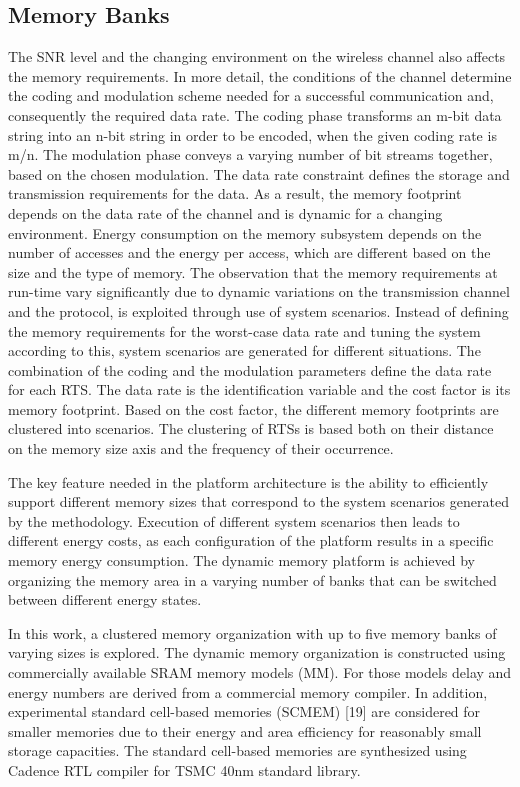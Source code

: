 \subsection{Memory Banks}

The SNR level and the changing environment on the wireless channel also affects the memory requirements. In more detail, the conditions of the channel determine the coding and modulation scheme needed for a successful communication and, consequently the required data rate. The coding phase transforms an m-bit data string into an n-bit string in order to be encoded, when the given coding rate is m/n. The modulation phase conveys a varying number of bit streams together, based on the chosen modulation. The data rate constraint defines the storage and transmission requirements for the data. As a result, the memory footprint depends on the data rate of the channel and is dynamic for a changing environment. Energy consumption on the memory subsystem depends on the number of accesses and the energy per access, which are different based on the size and the type of memory.
The observation that the memory requirements at run-time vary significantly due to dynamic variations on the transmission channel and the protocol, is exploited through use of system scenarios. Instead of defining the memory requirements for the worst-case data rate and tuning the system according to this, system scenarios are generated for different situations. The combination of the coding and the modulation parameters define the data rate for each RTS. The data rate is the identification variable and the cost factor is its memory footprint. Based on the cost factor, the different memory footprints are clustered into scenarios. The clustering of RTSs is based both on their distance on the memory size axis and the frequency of their occurrence.

The key feature needed in the platform architecture is the ability to efficiently support different memory sizes that correspond to the system scenarios generated by the methodology. Execution of different system scenarios then leads to different energy costs, as each configuration of the platform results in a specific memory energy consumption. The dynamic memory platform is achieved by organizing the memory area in a varying number of banks that can be switched between different energy states.  

In this work, a clustered memory organization with up to five memory banks of varying sizes is explored. The dynamic memory organization is constructed using commercially available SRAM memory models (MM). For those models delay and energy numbers are derived from a commercial memory compiler. In addition, experimental standard cell-based memories (SCMEM) [19] are considered for smaller memories due to their energy and area efficiency for reasonably small storage capacities. The standard cell-based memories are synthesized using Cadence RTL compiler for TSMC 40nm standard library.

